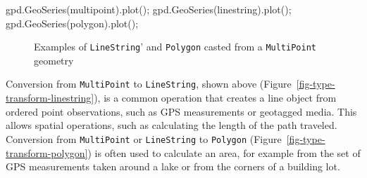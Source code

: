 \documentclass[
  letterpaper,
]{krantz}
\newenvironment{Shaded}{\begin{snugshade}}{\end{snugshade}}
\newcommand{\NormalTok}[1]{\textcolor[rgb]{0.00,0.23,0.31}{#1}}
\newcommand{\OperatorTok}[1]{\textcolor[rgb]{0.37,0.37,0.37}{#1}}
\begin{document}
\begin{Shaded}
\begin{Highlighting}[]
\NormalTok{gpd.GeoSeries(multipoint).plot()}\OperatorTok{;}
\NormalTok{gpd.GeoSeries(linestring).plot()}\OperatorTok{;}
\NormalTok{gpd.GeoSeries(polygon).plot()}\OperatorTok{;}
\end{Highlighting}
\end{Shaded}

\begin{figure}

\begin{minipage}{0.33\linewidth}



\end{minipage}%
%
\begin{minipage}{0.33\linewidth}



\end{minipage}%
%
\begin{minipage}{0.33\linewidth}



\end{minipage}%

\caption{\label{fig-casting1}Examples of
\texttt{\textquotesingle{}LineString}' and
\texttt{\textquotesingle{}Polygon\textquotesingle{}} casted from a
\texttt{\textquotesingle{}MultiPoint\textquotesingle{}} geometry}

\end{figure}%

Conversion from \texttt{\textquotesingle{}MultiPoint\textquotesingle{}}
to \texttt{\textquotesingle{}LineString\textquotesingle{}}, shown above
(Figure~\ref{fig-type-transform-linestring}), is a common operation that
creates a line object from ordered point observations, such as GPS
measurements or geotagged media. This allows spatial operations, such as
calculating the length of the path traveled. Conversion from
\texttt{\textquotesingle{}MultiPoint\textquotesingle{}} or
\texttt{\textquotesingle{}LineString\textquotesingle{}} to
\texttt{\textquotesingle{}Polygon\textquotesingle{}}
(Figure~\ref{fig-type-transform-polygon}) is often used to calculate an
area, for example from the set of GPS measurements taken around a lake
or from the corners of a building lot.
\end{document}
